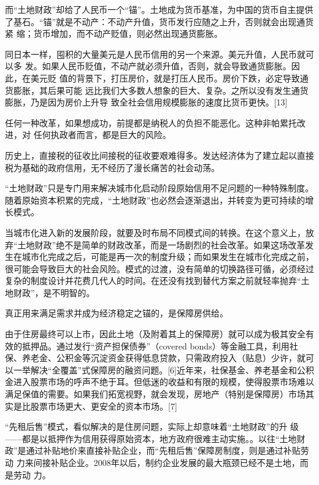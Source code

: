 而“土地财政”却给了人民币一个“锚”。土地成为货币基准，为中国的货币自主提供
了基石。“锚”就是不动产：不动产升值，货币发行应随之上升，否则就会出现通货紧
缩；货币增加，而不动产贬值，则必然出现通货膨胀。

同日本一样，囤积的大量美元是人民币信用的另一个来源。美元升值，人民币就可以多
发。如果人民币贬值，不动产就必须升值，否则，就会导致通货膨胀。因此，在美元贬
值的背景下，打压房价，就是打压人民币。房价下跌，必定导致通货膨胀，其后果可能
远比我们大多数人想象的巨大、复杂。之所以没有发生通货膨胀，乃是因为房价上升导
致全社会信用规模膨胀的速度比货币更快。[13]

任何一种改革，如果想成功，前提都是纳税人的负担不能恶化。这种非帕累托改进，对
任何执政者而言，都是巨大的风险。

历史上，直接税的征收比间接税的征收要艰难得多。发达经济体为了建立起以直接税为基础的政府信用，无不经历了漫长痛苦的社会动荡。

“土地财政”只是专门用来解决城市化启动阶段原始信用不足问题的一种特殊制度。随着原始资本积累的完成，“土地财政”也必然会逐渐退出，并转变为更可持续的增长模式。

当城市化进入新的发展阶段，就要及时布局不同模式间的转换。在这个意义上，放弃“土地财政”绝不是简单的财政改革，而是一场剧烈的社会改革。如果这场改革发生在城市化完成之后，可能是再一次的制度升级；而如果发生在城市化完成之前，很可能会导致巨大的社会风险。模式的过渡，没有简单的切换路径可循，必须经过复杂的制度设计并花费几代人的时间。在还没有找到替代方案之前就轻率抛弃“土地财政”，是不明智的。

真正用来满足需求并成为经济稳定之锚的，是保障房供给。

由于住房最终可以上市，因此土地（及附着其上的保障房）就可以成为极其安全有效的抵押品。通过发行“资产担保债券”（covered bonds）等金融工具，利用社保、养老金、公积金等沉淀资金获得低息贷款，只需政府投入（贴息）少许，就可以一举解决“全覆盖”式保障房的融资问题。[6]近年来，社保基金、养老基金和公积金进入股票市场的呼声不绝于耳。但低迷的收益和有限的规模，使得股票市场难以满足保值的需要。如果我们拓宽视野，就会发现，房地产（特别是保障房）市场其实是比股票市场更大、更安全的资本市场。[7]

“先租后售”模式，看似解决的是住房问题，实际上却意味着“土地财政”的升
级——都是以抵押作为信用获得原始资本，地方政府很难主动实施。。以往“土地财
政”是通过补贴地价来直接补贴企业，而“先租后售”保障房制度，则是通过补贴劳动
力来间接补贴企业。2008年以后，制约企业发展的最大瓶颈已经不是土地，而是劳动
力。

